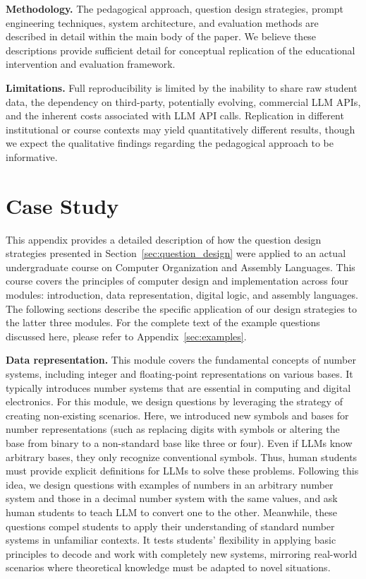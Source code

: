 \documentclass{article} %
\begin{document}
\textbf{Methodology.}
The pedagogical approach, question design strategies, prompt engineering techniques, system architecture, and evaluation methods are described in detail within the main body of the paper. We believe these descriptions provide sufficient detail for conceptual replication of the educational intervention and evaluation framework.

\textbf{Limitations.}
Full reproducibility is limited by the inability to share raw student data, the dependency on third-party, potentially evolving, commercial LLM APIs, and the inherent costs associated with LLM API calls. Replication in different institutional or course contexts may yield quantitatively different results, though we expect the qualitative findings regarding the pedagogical approach to be informative.




\appendix

\section{Case Study}
\label{sec:case_study}
This appendix provides a detailed description of how the question design strategies presented in Section~\ref{sec:question_design} were applied to an actual undergraduate course on Computer Organization and Assembly Languages. This course covers the principles of computer design and implementation across four modules: introduction, data representation, digital logic, and assembly languages. The following sections describe the specific application of our design strategies to the latter three modules. For the complete text of the example questions discussed here, please refer to Appendix~\ref{sec:examples}.

{\bf Data representation.} This module covers the fundamental concepts of number systems, including integer and floating-point representations on various bases. It typically introduces number systems that are essential in computing and digital electronics. For this module, we design questions by leveraging the strategy of creating non-existing scenarios. Here, we introduced new symbols and bases for number representations (such as replacing digits with symbols or altering the base from binary to a non-standard base like three or four). Even if LLMs know arbitrary bases, they only recognize conventional symbols. Thus, human students must provide explicit definitions for LLMs to solve these problems. Following this idea, we design questions with examples of numbers in an arbitrary number system and those in a decimal number system with the same values, and ask human students to teach LLM to convert one to the other.  Meanwhile, these questions compel students to apply their understanding of standard number systems in unfamiliar contexts. It tests students' flexibility in applying basic principles to decode and work with completely new systems, mirroring real-world scenarios where theoretical knowledge must be adapted to novel situations.
\end{document}
